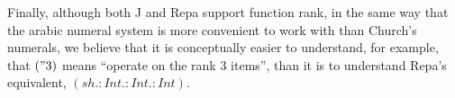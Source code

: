 Finally, although both J and Repa support function rank, 
in the same way that the arabic numeral system is more convenient to work with than Church's numerals, 
we believe that it is conceptually easier to understand, for example, that $(" 3)$ means ``operate on the rank 3 items'', than it is to understand Repa's equivalent, $(sh.:Int.:Int.:Int)$.

